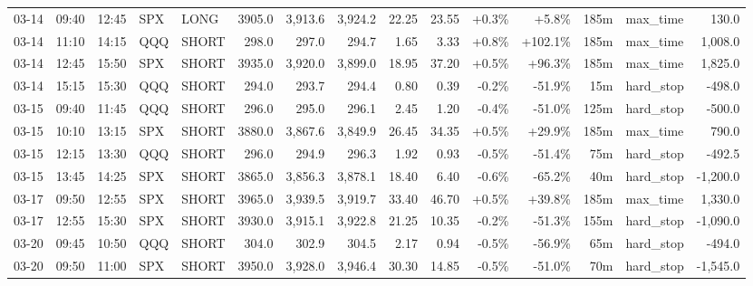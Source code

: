 \documentclass[11pt,a4paper,twoside]{article}
\begin{document}
\begin{landscape}
\begin{center}
\begin{longtable}{>{\color{txtmain}}l l l l l r r r r r r r r >{\color{txtmain}}l r}
03-14 & 09:40 & 12:45 & SPX & LONG & 3905.0 & 3,913.6 & 3,924.2 & 22.25 & 23.55 & \textcolor{wingreen}{+0.3\%} & \textcolor{wingreen}{+5.8\%} & 185m & max\_time & \textcolor{wingreen}{130.0} \\
03-14 & 11:10 & 14:15 & QQQ & SHORT & 298.0 & 297.0 & 294.7 & 1.65 & 3.33 & \textcolor{wingreen}{+0.8\%} & \textcolor{wingreen}{+102.1\%} & 185m & max\_time & \textcolor{wingreen}{1,008.0} \\
03-14 & 12:45 & 15:50 & SPX & SHORT & 3935.0 & 3,920.0 & 3,899.0 & 18.95 & 37.20 & \textcolor{wingreen}{+0.5\%} & \textcolor{wingreen}{+96.3\%} & 185m & max\_time & \textcolor{wingreen}{1,825.0} \\
03-14 & 15:15 & 15:30 & QQQ & SHORT & 294.0 & 293.7 & 294.4 & 0.80 & 0.39 & \textcolor{lossred}{-0.2\%} & \textcolor{lossred}{-51.9\%} & 15m & hard\_stop & \textcolor{lossred}{-498.0} \\
03-15 & 09:40 & 11:45 & QQQ & SHORT & 296.0 & 295.0 & 296.1 & 2.45 & 1.20 & \textcolor{lossred}{-0.4\%} & \textcolor{lossred}{-51.0\%} & 125m & hard\_stop & \textcolor{lossred}{-500.0} \\
03-15 & 10:10 & 13:15 & SPX & SHORT & 3880.0 & 3,867.6 & 3,849.9 & 26.45 & 34.35 & \textcolor{wingreen}{+0.5\%} & \textcolor{wingreen}{+29.9\%} & 185m & max\_time & \textcolor{wingreen}{790.0} \\
03-15 & 12:15 & 13:30 & QQQ & SHORT & 296.0 & 294.9 & 296.3 & 1.92 & 0.93 & \textcolor{lossred}{-0.5\%} & \textcolor{lossred}{-51.4\%} & 75m & hard\_stop & \textcolor{lossred}{-492.5} \\
03-15 & 13:45 & 14:25 & SPX & SHORT & 3865.0 & 3,856.3 & 3,878.1 & 18.40 & 6.40 & \textcolor{lossred}{-0.6\%} & \textcolor{lossred}{-65.2\%} & 40m & hard\_stop & \textcolor{lossred}{-1,200.0} \\
03-17 & 09:50 & 12:55 & SPX & SHORT & 3965.0 & 3,939.5 & 3,919.7 & 33.40 & 46.70 & \textcolor{wingreen}{+0.5\%} & \textcolor{wingreen}{+39.8\%} & 185m & max\_time & \textcolor{wingreen}{1,330.0} \\
03-17 & 12:55 & 15:30 & SPX & SHORT & 3930.0 & 3,915.1 & 3,922.8 & 21.25 & 10.35 & \textcolor{lossred}{-0.2\%} & \textcolor{lossred}{-51.3\%} & 155m & hard\_stop & \textcolor{lossred}{-1,090.0} \\
03-20 & 09:45 & 10:50 & QQQ & SHORT & 304.0 & 302.9 & 304.5 & 2.17 & 0.94 & \textcolor{lossred}{-0.5\%} & \textcolor{lossred}{-56.9\%} & 65m & hard\_stop & \textcolor{lossred}{-494.0} \\
03-20 & 09:50 & 11:00 & SPX & SHORT & 3950.0 & 3,928.0 & 3,946.4 & 30.30 & 14.85 & \textcolor{lossred}{-0.5\%} & \textcolor{lossred}{-51.0\%} & 70m & hard\_stop & \textcolor{lossred}{-1,545.0} \\

\end{longtable}
\end{center}
\end{landscape}
\end{document}
